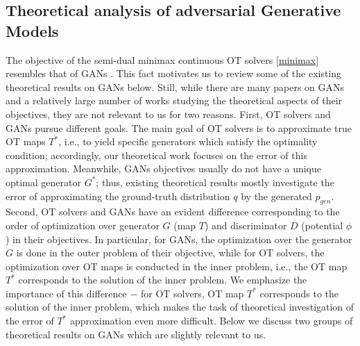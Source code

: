 \subsection{Theoretical analysis of adversarial Generative Models}\label{subsec:works-gans}
The objective of the semi-dual minimax continuous OT solvers \eqref{minimax} resembles that of GANs \citep{goodfellow2014generative}. This fact motivates us to review some of the existing theoretical results on GANs below. Still, while there are many papers on GANs \citep{pan2019recent} and a relatively large number of works studying the theoretical aspects of their objectives, they are not relevant to us for two reasons. First, OT solvers and GANs pursue different goals. The main goal of OT solvers is to approximate true OT maps $T^*$, i.e., to yield specific generators which satisfy the optimality condition; accordingly, our theoretical work focuses on the error of this approximation. Meanwhile, GANs objectives usually do not have a unique optimal generator $G^*$; thus, existing theoretical results mostly investigate the error of approximating the ground-truth distribution $q$ by the generated $p_{gen}$. Second, OT solvers and GANs have an evident difference corresponding to the order of 
optimization over generator $G$ (map $T$) and discriminator $D$ (potential $\phi$) in their objectives. In particular, for GANs, the optimization over the generator $G$ is done in the outer problem of their objective, while for OT solvers, the optimization over OT maps is conducted in the inner problem, i.e., the OT map $T^*$ corresponds to the solution of the inner problem. We emphasize the importance of this difference $-$ for OT solvers, OT map $T^*$ corresponds to the solution of the inner problem, which makes the task of theoretical investigation of the error of $T^*$ approximation even more difficult.
Below we discuss two groups of theoretical results on GANs which are slightly relevant to us.


